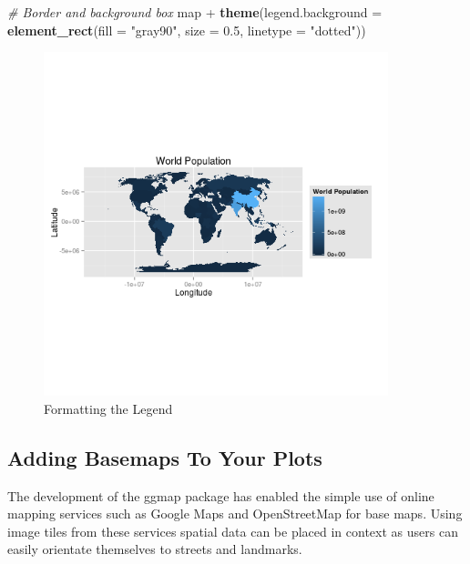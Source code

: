 \documentclass[]{article}
\newenvironment{Shaded}{}{}
\newcommand{\KeywordTok}[1]{\textcolor[rgb]{0.00,0.44,0.13}{\textbf{{#1}}}}
\newcommand{\DataTypeTok}[1]{\textcolor[rgb]{0.56,0.13,0.00}{{#1}}}
\newcommand{\FloatTok}[1]{\textcolor[rgb]{0.25,0.63,0.44}{{#1}}}
\newcommand{\StringTok}[1]{\textcolor[rgb]{0.25,0.44,0.63}{{#1}}}
\newcommand{\CommentTok}[1]{\textcolor[rgb]{0.38,0.63,0.69}{\textit{{#1}}}}
\newcommand{\NormalTok}[1]{{#1}}
\let\Oldincludegraphics\includegraphics
\renewcommand{\includegraphics}[1]{\Oldincludegraphics[width=10cm]{#1}}
\begin{document}
\begin{Shaded}
\begin{Highlighting}[]

\CommentTok{# Border and background box}
\NormalTok{map + }\KeywordTok{theme}\NormalTok{(}\DataTypeTok{legend.background =} \KeywordTok{element_rect}\NormalTok{(}\DataTypeTok{fill =} \StringTok{"gray90"}\NormalTok{, }\DataTypeTok{size =} \FloatTok{0.5}\NormalTok{, }\DataTypeTok{linetype =} \StringTok{"dotted"}\NormalTok{))}
\end{Highlighting}
\end{Shaded}
\begin{figure}[htbp]
\centering
\includegraphics{figure/Formatting_the_Legend4.png}
\caption{Formatting the Legend}
\end{figure}

\subsection{Adding Basemaps To Your Plots}

The development of the ggmap package has enabled the simple use of
online mapping services such as Google Maps and OpenStreetMap for base
maps. Using image tiles from these services spatial data can be placed
in context as users can easily orientate themselves to streets and
landmarks.
\end{document}
